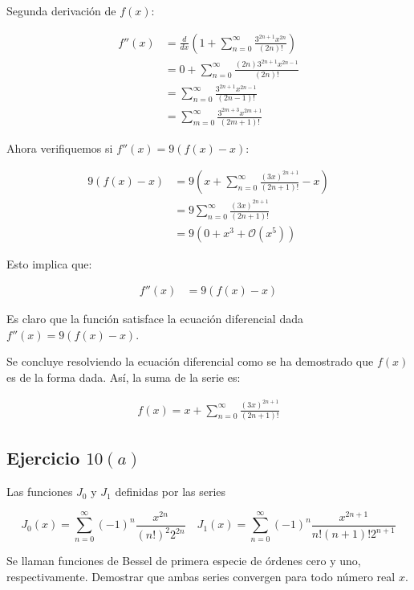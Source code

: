 \documentclass{article}
\begin{document}
    Segunda derivación de $f(x)$:

    \begin{align*}
    f''(x) &= \frac{d}{dx} \left( 1 + \sum_{n=0}^{\infty} \frac{3^{2n+1} x^{2n}}{(2n)!} \right) \\
    &= 0 + \sum_{n=0}^{\infty} \frac{(2n)3^{2n+1} x^{2n-1}}{(2n)!} \\
    &= \sum_{n=0}^{\infty} \frac{3^{2n+1} x^{2n-1}}{(2n-1)!} \\
    &= \sum_{m=0}^{\infty} \frac{3^{2m+3} x^{2m+1}}{(2m+1)!}
    \end{align*}

    Ahora verifiquemos si $f''(x) = 9(f(x) - x)$:

    \begin{align*}
    9(f(x) - x)&=9\left(x+\sum_{n=0}^{\infty} \frac{(3 x)^{2 n+1}}{(2 n+1)!}-x\right) \\
    &= 9\sum_{n=0}^{\infty} \frac{(3 x)^{2 n+1}}{(2 n+1)!} \\
    &= 9 ( 0 + x^3 + \mathcal{O}(x^5))
    \end{align*}

    Esto implica que:

    \begin{align*}
    f''(x) &= 9(f(x) - x)
    \end{align*}

    Es claro que la función satisface la ecuación diferencial dada $f''(x) = 9(f(x) - x)$.

    Se concluye resolviendo la ecuación diferencial como se ha demostrado que $f(x)$ es de la forma dada. Así, la suma de la serie es:

    \begin{align*}
    f(x) = x + \sum_{n=0}^{\infty} \frac{(3 x)^{2 n+1}}{(2 n+1)!}
    \end{align*}

    \subsection*{Ejercicio $10(a)$}

    Las funciones $J_{0}$ y $J_{1}$ definidas por las series

    $$
    J_{0}(x)=\sum_{n=0}^{\infty}(-1)^{n} \frac{x^{2 n}}{(n!)^{2} 2^{2 n}} \quad J_{1}(x)=\sum_{n=0}^{\infty}(-1)^{n} \frac{x^{2 n+1}}{n!(n+1)!2^{n+1}}
    $$

    Se llaman funciones de Bessel de primera especie de órdenes cero y uno, respectivamente. Demostrar que ambas series convergen para todo número real $x$.
\end{document}
